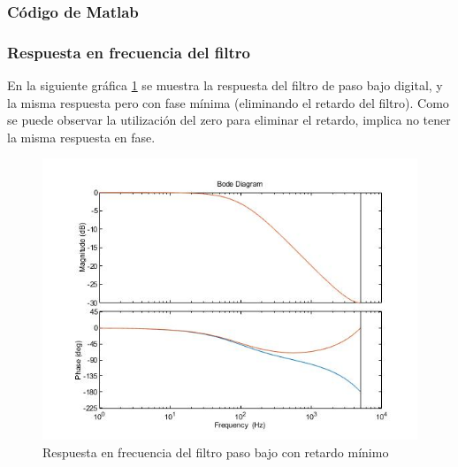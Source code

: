 \documentclass[titlepage]{article}
\begin{document}
\subsubsection{Código de Matlab}

\subsubsection{Respuesta en frecuencia del filtro}
En la siguiente gráfica \ref{fig:filtro_paso_bajo_minimo_retardo} se muestra la respuesta del filtro de paso bajo digital, y la misma respuesta pero con fase mínima (eliminando el retardo del filtro). Como se puede observar la utilización del zero para eliminar el retardo, implica no tener la misma respuesta en fase.
\begin{figure}[H]
  \centering
	\includegraphics[scale=0.5]{filtro_paso_bajo_minimo_retardo}
  \caption{Respuesta en frecuencia del filtro paso bajo con retardo mínimo}
  \label{fig:filtro_paso_bajo_minimo_retardo}
\end{figure}
\end{document}
